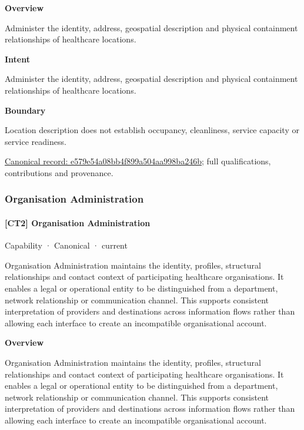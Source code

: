 \textbf{Overview}



Administer the identity, address, geospatial description and physical containment relationships of healthcare locations.



\textbf{Intent}



Administer the identity, address, geospatial description and physical containment relationships of healthcare locations.



\textbf{Boundary}



Location description does not establish occupancy, cleanliness, service capacity or service readiness.


{\footnotesize \href{../../../../continuum/strategy/capability/e579e54a08bb4f899a504aa998ba246b.md}{Canonical record: e579e54a08bb4f899a504aa998ba246b}; full qualifications, contributions and provenance.}\par
\subsubsection{Organisation Administration}

\paragraph{[CT2] Organisation Administration}

\label{element:14fbdc5ce3dd4c2092c5397dab3ed743}
{\small Capability · Canonical · current}\par

Organisation Administration maintains the identity, profiles, structural relationships and contact context of participating healthcare organisations. It enables a legal or operational entity to be distinguished from a department, network relationship or communication channel. This supports consistent interpretation of providers and destinations across information flows rather than allowing each interface to create an incompatible organisational account.



\textbf{Overview}



Organisation Administration maintains the identity, profiles, structural relationships and contact context of participating healthcare organisations. It enables a legal or operational entity to be distinguished from a department, network relationship or communication channel. This supports consistent interpretation of providers and destinations across information flows rather than allowing each interface to create an incompatible organisational account.



